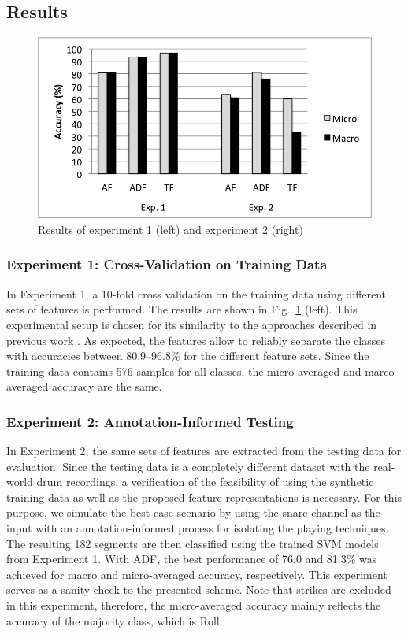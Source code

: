 \documentclass{article}
\begin{document}
\subsection{Results}\label{ssec:results}
\begin{figure}
\centering
\includegraphics[width = 8.0 cm]{./figures/exp1_exp2.png}
\caption{Results of experiment 1 (left) and experiment 2 (right)}
\label{fig:exp1n2}
\end{figure}

\subsubsection{Experiment 1: Cross-Validation on Training Data}\label{sssec:exp1}
In Experiment 1, a 10-fold cross validation on the training data using different sets of features is performed. The results are shown in Fig.~\ref{fig:exp1n2} (left). This experimental setup is chosen for its similarity to the approaches described in previous work \cite{Tindale2004, Prockup2013}. As expected, the features allow to reliably separate the classes with accuracies between 80.9--96.8\% for the different feature sets. Since the training data contains 576 samples for all classes, the micro-averaged and marco-averaged accuracy are the same.

\subsubsection{Experiment 2: Annotation-Informed Testing}\label{sssec:exp2}
In Experiment 2, the same sets of features are extracted from the testing data for evaluation. Since the testing data is a completely different dataset with the real-world drum recordings, a verification of the feasibility of using the synthetic training data as well as the proposed feature representations is necessary. For this purpose, we simulate the best case scenario by using the snare channel as the input with an annotation-informed process for isolating the playing techniques. The resulting 182 segments are then classified using the trained SVM models from Experiment 1. With ADF, the best performance of 76.0 and 81.3\% was achieved for macro and micro-averaged accuracy, respectively. This experiment serves as a sanity check to the presented scheme. %
{\color{red}Note that strikes are excluded in this experiment, therefore, the micro-averaged accuracy mainly reflects the accuracy of the majority class, which is Roll.} 
\end{document}
